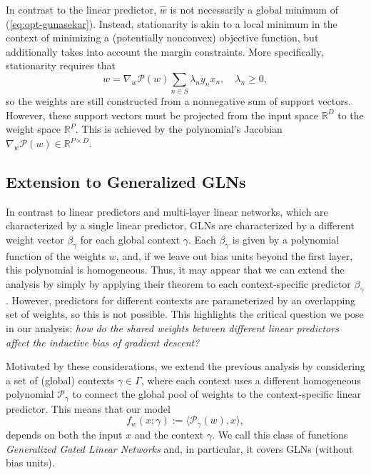 \documentclass{article}
\theoremstyle{plain}
\theoremstyle{definition}
\theoremstyle{remark}
\begin{document}
In contrast to the linear predictor, $\hat{w}$ is not necessarily a global minimum of (\ref{eq:opt-gunasekar}).
Instead, stationarity is akin to a local minimum in the context of minimizing a (potentially nonconvex) objective function, but additionally takes into account the margin constraints.
More specifically, stationarity requires that
\begin{equation}
\label{eq:stat-gunasekar}
    \hat{w} = \nabla_w\mathcal{P}(w)\sum_{n\in S}\lambda_ny_nx_n,\quad
    \lambda_n\geq 0,
\end{equation}
so the weights are still constructed from a nonnegative sum of support vectors.
However, these support vectors must be projected from the input space $\mathbb{R}^D$ to the weight space $\mathbb{R}^P$.
This is achieved by the polynomial's Jacobian $\nabla_w\mathcal{P}(w)\in\mathbb{R}^{P\times D}$.


\subsection{Extension to Generalized GLNs}

In contrast to linear predictors and multi-layer linear networks, which are characterized by a single linear predictor, GLNs are characterized by a different weight vector $\beta_{\gamma}$ for each global context $\gamma$. Each $\beta_{\gamma}$ is given by a polynomial function of the weights $w$, and, if we leave out bias units beyond the first layer, this polynomial is homogeneous. Thus, it may appear that we can extend the analysis by \citet{gunasekar_implicit_2018} simply by applying their theorem to each context-specific predictor $\beta_{\gamma}$. However, predictors for different contexts are parameterized by an overlapping set of weights, so this is not possible. This highlights the critical question we pose in our analysis: \emph{how do the shared weights between different linear predictors affect the inductive bias of gradient descent?}

Motivated by these considerations, we extend the previous analysis by considering a set of (global) contexts $\gamma\in\Gamma$, where each context uses a different homogeneous polynomial $\mathcal{P}_{\gamma}$ to connect the global pool of weights to the context-specific linear predictor.
This means that our model
\begin{equation}
    f_w(x;\gamma):=\langle\mathcal{P}_{\gamma}(w),x\rangle,
\end{equation}
depends on both the input $x$ and the context $\gamma$.
We call this class of functions \emph{Generalized Gated Linear Networks} and, in particular, it covers GLNs (without bias units).
\end{document}
